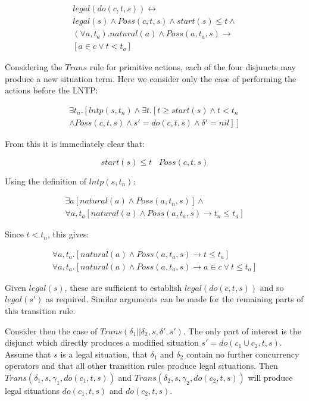 \documentclass{llncs}
\begin{document}
\[
\begin{array}{c}
legal(do(c,t,s))\leftrightarrow\\
legal(s)\wedge Poss(c,t,s)\wedge start(s)\leq t\wedge\\
(\forall a,t_{a}).natural(a)\wedge Poss(a,t_{a},s)\rightarrow\\
\left[a\in c\vee t<t_{a}\right]\end{array}\]


Considering the $Trans$ rule for primitive actions, each of the four
disjuncts may produce a new situation term. Here we consider only
the case of performing the actions before the LNTP:

\[
\begin{array}{c}
\exists t_{n}.\left[lntp(s,t_{n})\wedge\exists t.\left[t\geq start(s)\wedge t<t_{n}\right.\right.\\
\left.\left.\wedge Poss(c,t,s)\wedge s'=do(c,t,s)\wedge\delta'=nil\right]\right]\end{array}\]


From this it is immediately clear that:

\[
start(s)\leq t\,\,\,\,\, Poss(c,t,s)\]


Using the definition of $lntp(s,t_{n})$:

\[
\begin{array}{c}
\exists a\left[natural(a)\wedge Poss(a,t_{n},s)\right]\wedge\\
\forall a,t_{a}\left[natural(a)\wedge Poss(a,t_{a},s)\rightarrow t_{n}\leq t_{a}\right]\end{array}\]


Since $t<t_{n}$, this gives:

\[
\begin{array}{c}
\forall a,t_{a}.\left[natural(a)\wedge Poss(a,t_{a},s)\rightarrow t\leq t_{a}\right]\\
\forall a,t_{a}.\left[natural(a)\wedge Poss(a,t_{a},s)\rightarrow a\in c\vee t\leq t_{a}\right]\end{array}\]


Given $legal(s)$, these are sufficient to establish $legal(do(c,t,s))$
and so $legal(s')$ as required. Similar arguments can be made for
the remaining parts of this transition rule.

Consider then the case of $Trans(\delta_{1}||\delta_{2},s,\delta',s')$.
The only part of interest is the disjunct which directly produces
a modified situation $s'=do(c_{1}\cup c_{2},t,s)$. Assume that $s$
is a legal situation, that $\delta_{1}$ and $\delta_{2}$ contain
no further concurrency operators and that all other transition rules
produce legal situations. Then $Trans(\delta_{1},s,\gamma_{1},do(c_{1},t,s))$
and $Trans(\delta_{2},s,\gamma_{2},do(c_{2},t,s))$ will produce legal
situations $do(c_{1},t,s)$ and $do(c_{2},t,s)$.
\end{document}
